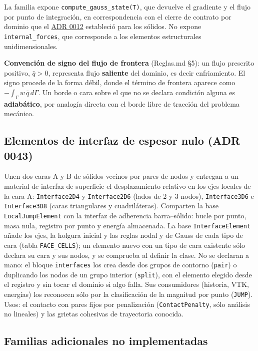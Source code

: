 \documentclass[11pt,oneside]{report}
\begin{document}
La familia expone \texttt{compute\_\allowbreak{}gauss\_\allowbreak{}state(T)}, que devuelve el gradiente y el flujo por punto de integración, en correspondencia con el cierre de contrato por dominio que el \hyperref[adr:0012]{ADR 0012} estableció para los sólidos. No expone \texttt{internal\_forces}, que corresponde a los elementos estructurales unidimensionales.

\textbf{Convención de signo del flujo de frontera} (Reglas.md §5): un flujo prescrito positivo, $\bar q > 0$, representa flujo \textbf{saliente} del dominio, es decir enfriamiento. El signo procede de la forma débil, donde el término de frontera aparece como $-\int_\Gamma w\,\bar q\,d\Gamma$. Un borde o cara sobre el que no se declara condición alguna es \textbf{adiabático}, por analogía directa con el borde libre de tracción del problema mecánico.

\subsection{Elementos de interfaz de espesor nulo (ADR 0043)}

Unen dos caras A y B de sólidos vecinos por pares de nodos y entregan a un material de interfaz de superficie el desplazamiento relativo en los ejes locales de la cara A: \texttt{Interface2D4} y \texttt{Interface2D6} (lados de 2 y 3 nodos), \texttt{Interface3D6} e \texttt{Interface3D8} (caras triangulares y cuadriláteras). Comparten la base \texttt{LocalJumpElement} con la interfaz de adherencia barra--sólido: bucle por punto, masa nula, registro por punto y energía almacenada. La base \texttt{InterfaceElement} añade los ejes, la holgura inicial y las reglas nodal y de Gauss de cada tipo de cara (tabla \texttt{FACE\_CELLS}); un elemento nuevo con un tipo de cara existente sólo declara su cara y sus nodos, y se comprueba al definir la clase. No se declaran a mano: el bloque \texttt{interfaces} los crea desde dos grupos de contorno (\texttt{pair}) o duplicando los nodos de un grupo interior (\texttt{split}), con el elemento elegido desde el registro y sin tocar el dominio si algo falla. Sus consumidores (historia, VTK, energías) los reconocen sólo por la clasificación de la magnitud por punto (\texttt{JUMP}). Usos: el contacto con pares fijos por penalización (\texttt{ContactPenalty}, sólo análisis no lineales) y las grietas cohesivas de trayectoria conocida.

\subsection{Familias adicionales no implementadas}
\end{document}
